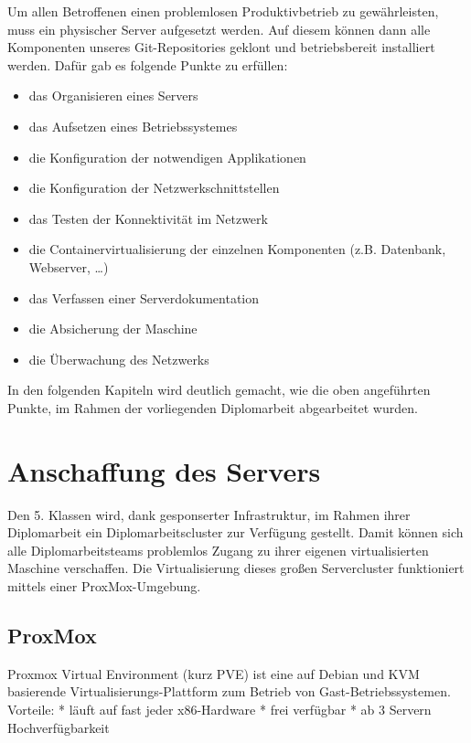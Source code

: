 Um allen Betroffenen einen problemlosen Produktivbetrieb zu
gewährleisten, muss ein physischer Server aufgesetzt werden. Auf diesem
können dann alle Komponenten unseres Git-Repositories geklont und
betriebsbereit installiert werden. Dafür gab es folgende Punkte zu
erfüllen:

\begin{itemize}
\tightlist
\item
  das Organisieren eines Servers
\item
  das Aufsetzen eines Betriebssystemes
\item
  die Konfiguration der notwendigen Applikationen
\item
  die Konfiguration der Netzwerkschnittstellen
\item
  das Testen der Konnektivität im Netzwerk
\item
  die Containervirtualisierung der einzelnen Komponenten (z.B.
  Datenbank, Webserver, \ldots)
\item
  das Verfassen einer Serverdokumentation
\item
  die Absicherung der Maschine
\item
  die Überwachung des Netzwerks
\end{itemize}

In den folgenden Kapiteln wird deutlich gemacht, wie die oben
angeführten Punkte, im Rahmen der vorliegenden Diplomarbeit abgearbeitet
wurden.

\hypertarget{anschaffung-des-servers}{%
\section{Anschaffung des Servers}\label{anschaffung-des-servers}}

Den 5. Klassen wird, dank gesponserter Infrastruktur, im Rahmen ihrer
Diplomarbeit ein Diplomarbeitscluster zur Verfügung gestellt. Damit
können sich alle Diplomarbeitsteams problemlos Zugang zu ihrer eigenen
virtualisierten Maschine verschaffen. Die Virtualisierung dieses großen
Servercluster funktioniert mittels einer ProxMox-Umgebung.

\hypertarget{proxmox}{%
\subsection{ProxMox}\label{proxmox}}

Proxmox Virtual Environment (kurz PVE) ist eine auf Debian und KVM
basierende Virtualisierungs-Plattform zum Betrieb von
Gast-Betriebssystemen. Vorteile: * läuft auf fast jeder x86-Hardware *
frei verfügbar * ab 3 Servern Hochverfügbarkeit

